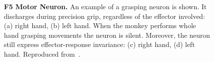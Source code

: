 \begin{figure}
	\centering
	  \hspace{0.05\textwidth}


	  \hspace{0.05\textwidth}


	\caption[F5 Motor Neuron]{\textbf{F5 Motor Neuron.}
	An example of a grasping neuron is shown. 
	It discharges during precision grip, regardless of the effector involved:
	(a) right hand, (b) left hand.
	When the monkey performs whole hand grasping movements the neuron is silent.
	Moreover, the neuron still express effector-response invariance: (c) right
	hand, (d) left hand.
	Reproduced from~\citet{metta.etal:2006}.}
	\label{fig:actions:F5:motor:a}
\end{figure}
